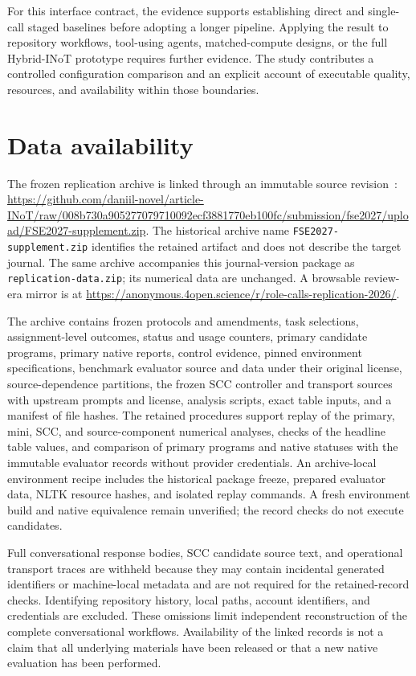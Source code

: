 For this interface contract, the evidence supports establishing direct and single-call staged baselines before adopting a longer pipeline. Applying the result to repository workflows, tool-using agents, matched-compute designs, or the full Hybrid-INoT prototype requires further evidence. The study contributes a controlled configuration comparison and an explicit account of executable quality, resources, and availability within those boundaries.

\section*{Data availability}
The frozen replication archive is linked through an immutable source revision~\citep{privezentsev2026replication}: \url{https://github.com/daniil-novel/article-INoT/raw/008b730a905277079710092ecf3881770eb100fc/submission/fse2027/upload/FSE2027-supplement.zip}. The historical archive name \texttt{FSE2027-supplement.zip} identifies the retained artifact and does not describe the target journal. The same archive accompanies this journal-version package as \texttt{replication-data.zip}; its numerical data are unchanged. A browsable review-era mirror is at \url{https://anonymous.4open.science/r/role-calls-replication-2026/}.

The archive contains frozen protocols and amendments, task selections, assignment-level outcomes, status and usage counters, primary candidate programs, primary native reports, control evidence, pinned environment specifications, benchmark evaluator source and data under their original license, source-dependence partitions, the frozen SCC controller and transport sources with upstream prompts and license, analysis scripts, exact table inputs, and a manifest of file hashes. The retained procedures support replay of the primary, mini, SCC, and source-component numerical analyses, checks of the headline table values, and comparison of primary programs and native statuses with the immutable evaluator records without provider credentials. An archive-local environment recipe includes the historical package freeze, prepared evaluator data, NLTK resource hashes, and isolated replay commands. A fresh environment build and native equivalence remain unverified; the record checks do not execute candidates.

Full conversational response bodies, SCC candidate source text, and operational transport traces are withheld because they may contain incidental generated identifiers or machine-local metadata and are not required for the retained-record checks. Identifying repository history, local paths, account identifiers, and credentials are excluded. These omissions limit independent reconstruction of the complete conversational workflows. Availability of the linked records is not a claim that all underlying materials have been released or that a new native evaluation has been performed.

